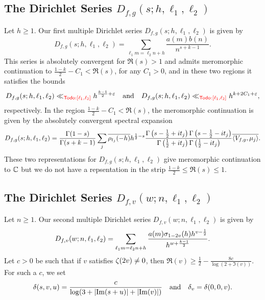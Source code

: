 \documentclass[12pt,reqno,oneside]{amsart}
\begin{document}
  \subsection*{The Dirichlet Series \texorpdfstring{$D_{f,g}(s;h,\ell_{1},\ell_{2})$}{}}
    Let $h \ge 1$. Our first multiple Dirichlet series $D_{f,g}(s;h,\ell_{1},\ell_{2})$ is given by
    \[
      D_{f,g}(s;h,\ell_{1},\ell_{2}) = \sum_{\ell_{1}m = \ell_{2}n+h}\frac{a(m)b(n)}{n^{s+k-1}}.
    \]
    This series is absolutely convergent for $\Re(s) > 1$ and admits meromorphic continuation to $\frac{1-k}{2}-C_{1} < \Re(s)$, for any $C_{1} > 0$, and in these two regions it satisfies the bounds
    \[
      D_{f,g}(s;h,\ell_{1},\ell_{2}) \ll_{\textcolor{red}{\sf Todo: [\ell_{1},\ell_{2}]}} h^{\frac{k-1}{2}+\varepsilon} \quad \text{and} \quad D_{f,g}(s;h,\ell_{1},\ell_{2}) \ll_{\textcolor{red}{\sf Todo: [\ell_{1},\ell_{2}]}} h^{k+2C_{1}+\varepsilon},
    \]
    respectively. In the region $\frac{1-k}{2}-C_{1} < \Re(s)$, the meromorphic continuation is given by the absolutely convergent spectral expansion
    \[
      D_{f,g}(s;h,\ell_{1},\ell_{2}) = \frac{\Gamma(1-s)}{\Gamma(s+k-1)}\sum_{j}\overline{\rho_{t_{j}}(-h)}h^{\frac{1}{2}-s}\frac{\Gamma\left(s-\frac{1}{2}+it_{j}\right)\Gamma\left(s-\frac{1}{2}-it_{j}\right)}{\Gamma\left(\frac{1}{2}+it_{j}\right)\Gamma\left(\frac{1}{2}-it_{j}\right)}\overline{\langle V_{f,g},\mu_{j}\rangle}.
    \]
    These two representations for $D_{f,g}(s;h,\ell_{1},\ell_{2})$ give meromorphic continuation to $\mathbb{C}$ but we do not have a repsentation in the strip $\frac{1-k}{2} \le \Re(s) \le 1$.
  \subsection*{The Dirichlet Series \texorpdfstring{$D_{f,v}(w;n,\ell_{1},\ell_{2})$}{}}
    Let $n \ge 1$. Our second multiple Dirichlet series $D_{f,v}(w;n,\ell_{1},\ell_{2})$ is given by
    \[
      D_{f,v}(w;n,\ell_{1},\ell_{2}) = \sum_{\ell_{1}m = \ell_{2}n+h}\frac{a(m)\sigma_{1-2v}(h)h^{v-\frac{1}{2}}}{h^{w+\frac{k-1}{2}}}.
    \]
    Let $c > 0$ be such that if $v$ satisfies $\zeta(2v) \neq 0$, then $\Re(v)\ge \frac{1}{2}-\frac{8c}{\log(2+\Im(v))}$. For such a $c$, we set
    \[
      \delta(s,v,u) = \frac{c}{\log(3+|\mathrm{Im}(s+u)|+|\mathrm{Im}(v)|)} \quad \text{and} \quad \delta_{v} = \delta(0,0,v).
    \]
    
\end{document}
